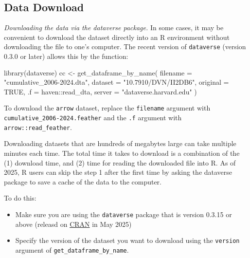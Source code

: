 \documentclass[10pt,article,oneside]{memoir}
\newenvironment{Shaded}{\begin{snugshade}}{\end{snugshade}}
\newcommand{\AttributeTok}[1]{\textcolor[rgb]{0.40,0.45,0.13}{#1}}
\newcommand{\ConstantTok}[1]{\textcolor[rgb]{0.56,0.35,0.01}{#1}}
\newcommand{\FunctionTok}[1]{\textcolor[rgb]{0.28,0.35,0.67}{#1}}
\newcommand{\NormalTok}[1]{\textcolor[rgb]{0.00,0.23,0.31}{#1}}
\newcommand{\OtherTok}[1]{\textcolor[rgb]{0.00,0.23,0.31}{#1}}
\newcommand{\SpecialCharTok}[1]{\textcolor[rgb]{0.37,0.37,0.37}{#1}}
\newcommand{\StringTok}[1]{\textcolor[rgb]{0.13,0.47,0.30}{#1}}
\begin{document}
\subsection{Data Download}\label{data-download}

\noindent \emph{Downloading the data via the dataverse package.} In some
cases, it may be convenient to download the dataset directly into an R
environment without downloading the file to one's computer. The recent
version of \texttt{dataverse} (version 0.3.0 or later) allows this by
the function:

\begin{Shaded}
\begin{Highlighting}[]
\FunctionTok{library}\NormalTok{(dataverse)}
\NormalTok{cc }\OtherTok{\textless{}{-}} \FunctionTok{get\_dataframe\_by\_name}\NormalTok{(}
  \AttributeTok{filename =} \StringTok{"cumulative\_2006{-}2024.dta"}\NormalTok{,}
  \AttributeTok{dataset =} \StringTok{"10.7910/DVN/II2DB6"}\NormalTok{,}
  \AttributeTok{original =} \ConstantTok{TRUE}\NormalTok{,}
  \AttributeTok{.f =}\NormalTok{ haven}\SpecialCharTok{::}\NormalTok{read\_dta,}
  \AttributeTok{server =} \StringTok{"dataverse.harvard.edu"}
\NormalTok{)}
\end{Highlighting}
\end{Shaded}

To download the \texttt{arrow} dataset, replace the \texttt{filename}
argument with \texttt{cumulative\_2006-2024.feather} and the \texttt{.f}
argument with \texttt{arrow::read\_feather}.

Downloading datasets that are hundreds of megabytes large can take
multiple minutes each time. The total time it takes to download is a
combination of the (1) download time, and (2) time for reading the
downloaded file into R. As of 2025, R users can skip the step 1 after
the first time by asking the dataverse package to save a cache of the
data to the computer.

To do this:

\begin{itemize}
\tightlist
\item
  Make sure you are using the \texttt{dataverse} package that is version
  0.3.15 or above (releasd on
  \href{https://cran.r-project.org/web/packages/dataverse/index.html}{CRAN}
  in May 2025)
\item
  Specify the version of the dataset you want to download using the
  \texttt{version} argument of \texttt{get\_dataframe\_by\_name}.
\end{itemize}
\end{document}
